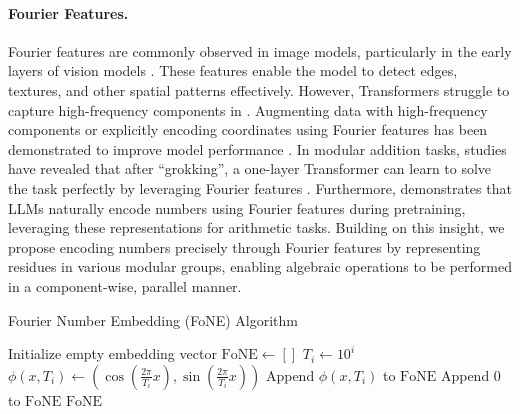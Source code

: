  


\paragraph{Fourier Features.}
Fourier features are commonly observed in image models, particularly in the early layers of vision models \cite{olshausen1997sparse,olah2020overview,fiquet2024polar}. These features enable the model to detect edges, textures, and other spatial patterns effectively. 
However, Transformers struggle to capture high-frequency components in \cite{bai2022improving,tancik2020fourier}. Augmenting data with high-frequency components or explicitly encoding coordinates using Fourier features has been demonstrated to improve model performance \cite{tancik2020fourier,he2024frequency}. 
In modular addition tasks, studies have revealed that after “grokking”, a one-layer Transformer can learn to solve the task perfectly by leveraging Fourier features \cite{nanda2023progress,gu2024fourier}. Furthermore, \citet{zhou2024pre}  demonstrates that LLMs naturally encode numbers using Fourier features during pretraining, leveraging these representations for arithmetic tasks. Building on this insight, we propose encoding numbers precisely through Fourier features by representing residues in various modular groups, enabling algebraic operations to be performed in a component-wise, parallel manner.

\ifdefined\isarxiv

\else
\begin{algorithm*}[!ht]
\caption{Fourier Number Embedding (FoNE) Algorithm}\label{alg:fne_algorithm_fixed}
    \begin{algorithmic}[1]
    \State Initialize empty embedding vector $\text{FoNE} \gets []$
     
        \State $T_i \gets 10^i$ 
        \State $\phi(x, T_i) \gets (\cos(\tfrac{2\pi}{T_i} x), \sin(\tfrac{2\pi}{T_i} x))$ 
        \State Append $\phi(x, T_i)$ to $\text{FoNE}$ 
    \EndFor
     
        \State Append $0$ to $\text{FoNE}$ 
    \EndWhile
    \State \Return $\text{FoNE}$ 
    \EndProcedure
    \end{algorithmic}
\end{algorithm*}
\fi